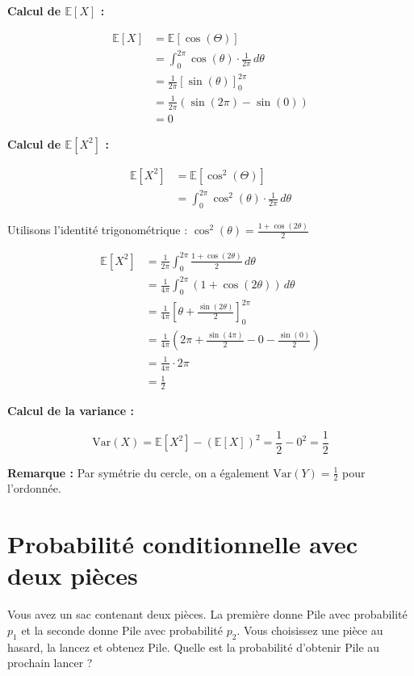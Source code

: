 \textbf{Calcul de $\mathbb{E}[X]$ :}

\begin{align*}
\mathbb{E}[X] &= \mathbb{E}[\cos(\Theta)] \\
&= \int_0^{2\pi} \cos(\theta) \cdot \frac{1}{2\pi} \, d\theta \\
&= \frac{1}{2\pi} \left[ \sin(\theta) \right]_0^{2\pi} \\
&= \frac{1}{2\pi} \left( \sin(2\pi) - \sin(0) \right) \\
&= 0
\end{align*}

\textbf{Calcul de $\mathbb{E}[X^2]$ :}

\begin{align*}
\mathbb{E}[X^2] &= \mathbb{E}[\cos^2(\Theta)] \\
&= \int_0^{2\pi} \cos^2(\theta) \cdot \frac{1}{2\pi} \, d\theta
\end{align*}

Utilisons l'identité trigonométrique : $\cos^2(\theta) = \frac{1 + \cos(2\theta)}{2}$

\begin{align*}
\mathbb{E}[X^2] &= \frac{1}{2\pi} \int_0^{2\pi} \frac{1 + \cos(2\theta)}{2} \, d\theta \\
&= \frac{1}{4\pi} \int_0^{2\pi} \left( 1 + \cos(2\theta) \right) \, d\theta \\
&= \frac{1}{4\pi} \left[ \theta + \frac{\sin(2\theta)}{2} \right]_0^{2\pi} \\
&= \frac{1}{4\pi} \left( 2\pi + \frac{\sin(4\pi)}{2} - 0 - \frac{\sin(0)}{2} \right) \\
&= \frac{1}{4\pi} \cdot 2\pi \\
&= \frac{1}{2}
\end{align*}

\textbf{Calcul de la variance :}

\[
\text{Var}(X) = \mathbb{E}[X^2] - (\mathbb{E}[X])^2 = \frac{1}{2} - 0^2 = \boxed{\frac{1}{2}}
\]

\textbf{Remarque :} Par symétrie du cercle, on a également $\text{Var}(Y) = \frac{1}{2}$ pour l'ordonnée.


\section{Probabilité conditionnelle avec deux pièces}

\begin{exerciseBox}
Vous avez un sac contenant deux pièces. La première donne Pile avec probabilité $p_1$ et la seconde donne Pile avec probabilité $p_2$. Vous choisissez une pièce au hasard, la lancez et obtenez Pile. Quelle est la probabilité d'obtenir Pile au prochain lancer ?
\end{exerciseBox}



